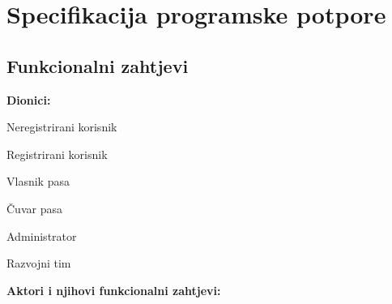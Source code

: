 \chapter{Specifikacija programske potpore}
		
	\section{Funkcionalni zahtjevi}
			
			\noindent \textbf{Dionici:}
			
			\begin{packed_enum}
				
				\item Neregistrirani korisnik
				\item Registrirani korisnik
				\begin{packed_enum}
					\item Vlasnik pasa
					\item Čuvar pasa
				\end{packed_enum}
				\item Administrator 				
				\item Razvojni tim
				
			\end{packed_enum}
			
			\noindent \textbf{Aktori i njihovi funkcionalni zahtjevi:}
			
